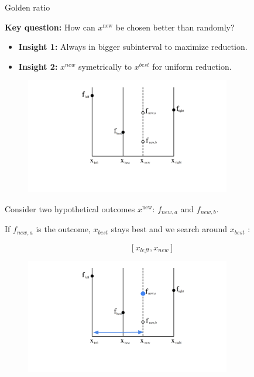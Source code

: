 \documentclass[11pt,compress,t,notes=noshow, xcolor=table]{beamer}
\begin{document}
\begin{vbframe}{Golden ratio}

\textbf{Key question:} How can $x^{\text{new}}$ be chosen better than randomly? 

\begin{itemize}
    \item \textbf{Insight 1: } Always in bigger subinterval to maximize reduction.
    \item \textbf{Insight 2: } $x^{new}$ symetrically to $x^{best}$ for uniform reduction. 
\end{itemize}

\begin{figure}
\includegraphics[width=0.8\textwidth]{figure_man/goldensec-0.png}
\end{figure}

\vspace*{-0.5cm}

Consider two hypothetical outcomes $x^{\text{new}}$: $f_{new, a}$ and $f_{new, b}$. 

\framebreak

If $f_{new, a}$ is the outcome, $x_{best}$ stays best and we search around $x_{best}$ : 

$$
    [x_{left}, x_{new}]
$$

\begin{figure}
\includegraphics[width=0.8\textwidth]{figure_man/goldensec-1.png}\\
\end{figure}


\end{vbframe}
\end{document}
